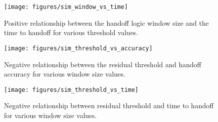 \begin{figure}[hbt]
  \centering
  \texttt{[image: figures/sim\_window\_vs\_time]}
  \caption{Positive relationship between the handoff logic window size and the time to handoff for various threshold values.}
  \label{fig:sim_window_vs_time}
\end{figure}

\begin{figure}[hbt]
  \centering
  \texttt{[image: figures/sim\_threshold\_vs\_accuracy]}
  \caption{Negative relationship between the residual threshold and handoff accuracy for various window size values.}
  \label{fig:sim_threshold_vs_accuracy}
\end{figure}

\begin{figure}[hbt]
  \centering
  \texttt{[image: figures/sim\_threshold\_vs\_time]}
  \caption{Negative relationship between residual threshold and time to handoff for various window size values.}
  \label{fig:sim_threshold_vs_time}
\end{figure}




